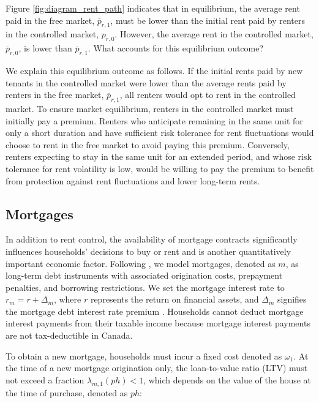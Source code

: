 \documentclass[parskip=full]{article}
\begin{document}
Figure \ref{fig:diagram_rent_path} indicates that in equilibrium, the average rent paid in the free market, $\overline{p}_{r,1}$, must be lower than the initial rent paid by renters in the controlled market, $p_{r,0}$. However, the average rent in the controlled market, $\overline{p}_{r,0}$, is lower than $\overline{p}_{r,1}$. What accounts for this equilibrium outcome?

We explain this equilibrium outcome as follows. If the initial rents paid by new tenants in the controlled market were lower than the average rents paid by renters in the free market, $\overline{p}_{r,1}$, all renters would opt to rent in the controlled market. To ensure market equilibrium, renters in the controlled market must initially pay a premium. Renters who anticipate remaining in the same unit for only a short duration and have sufficient risk tolerance for rent fluctuations would choose to rent in the free market to avoid paying this premium. Conversely, renters expecting to stay in the same unit for an extended period, and whose risk tolerance for rent volatility is low, would be willing to pay the premium to benefit from protection against rent fluctuations and lower long-term rents.

\subsection{Mortgages}\label{subsection:morgtages}

In addition to rent control, the availability of mortgage contracts significantly influences households' decisions to buy or rent and is another quantitatively important economic factor. Following \citet{kkk-2021}, we model mortgages, denoted as $m$, as long-term debt instruments with associated origination costs, prepayment penalties, and borrowing restrictions. We set the mortgage interest rate to $r_{m}=r+\Delta_m$, where $r$ represents the return on financial assets, and $\Delta_m$ signifies the mortgage debt interest rate premium \citep{sommeretal-2013,sommersullivan-2017,kaplanetal-2019}. Households cannot deduct mortgage interest payments from their taxable income because mortgage interest payments are not tax-deductible in Canada.

To obtain a new mortgage, households must incur a fixed cost denoted as $\omega_{1}$. At the time of a new mortgage origination only, the loan-to-value ratio (LTV) must not exceed a fraction $\lambda_{m,1}(ph)<1$, which depends on the value of the house at the time of purchase, denoted as $ph$:
\end{document}
